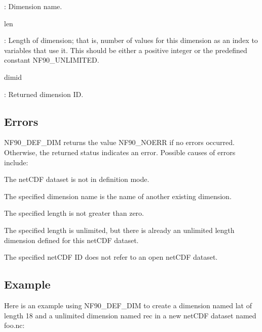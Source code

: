 \+: Dimension name.

{\ttfamily len}

\+: Length of dimension; that is, number of values for this dimension as an index to variables that use it. This should be either a positive integer or the predefined constant N\+F90\+\_\+\+U\+N\+L\+I\+M\+I\+T\+ED.

{\ttfamily dimid}

\+: Returned dimension ID.

\subsection*{Errors}

N\+F90\+\_\+\+D\+E\+F\+\_\+\+D\+IM returns the value N\+F90\+\_\+\+N\+O\+E\+RR if no errors occurred. Otherwise, the returned status indicates an error. Possible causes of errors include\+:


\begin{DoxyItemize}
\item The net\+C\+DF dataset is not in definition mode.
\item The specified dimension name is the name of another existing dimension.
\item The specified length is not greater than zero.
\item The specified length is unlimited, but there is already an unlimited length dimension defined for this net\+C\+DF dataset.
\item The specified net\+C\+DF ID does not refer to an open net\+C\+DF dataset.
\end{DoxyItemize}

\subsection*{Example}

Here is an example using N\+F90\+\_\+\+D\+E\+F\+\_\+\+D\+IM to create a dimension named lat of length 18 and a unlimited dimension named rec in a new net\+C\+DF dataset named foo.\+nc\+:


